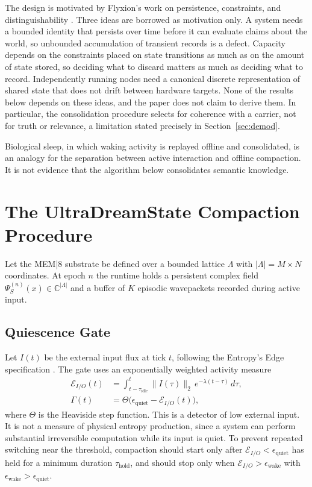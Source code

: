 \documentclass[10pt, twocolumn, a4paper]{article}
\begin{document}
The design is motivated by Flyxion's work on persistence, constraints, and distinguishability \cite{guimond2026admissibility, guimond2026collapse, guimond2026persistence, guimond2026constraints, guimond2026witness, guimond2026wireheading}. Three ideas are borrowed as motivation only. A system needs a bounded identity that persists over time before it can evaluate claims about the world, so unbounded accumulation of transient records is a defect. Capacity depends on the constraints placed on state transitions as much as on the amount of state stored, so deciding what to discard matters as much as deciding what to record. Independently running nodes need a canonical discrete representation of shared state that does not drift between hardware targets. None of the results below depends on these ideas, and the paper does not claim to derive them. In particular, the consolidation procedure selects for coherence with a carrier, not for truth or relevance, a limitation stated precisely in Section~\ref{sec:demod}.

Biological sleep, in which waking activity is replayed offline and consolidated, is an analogy for the separation between active interaction and offline compaction. It is not evidence that the algorithm below consolidates semantic knowledge.

\section{The UltraDreamState Compaction Procedure}

Let the MEM|8 substrate be defined over a bounded lattice $\Lambda$ with $|\Lambda| = M \times N$ coordinates. At epoch $n$ the runtime holds a persistent complex field $\Psi_S^{(n)}(x) \in \mathbb{C}^{|\Lambda|}$ and a buffer of $K$ episodic wavepackets recorded during active input.

\subsection{Quiescence Gate}
Let $I(t)$ be the external input flux at tick $t$, following the Entropy's Edge specification \cite{guimond2026entropy}. The gate uses an exponentially weighted activity measure
\begin{equation}
\begin{split}\mathcal{E}_{I/O}(t) &= \int_{t - \tau_{\text{idle}}}^{t} \|I(\tau)\|_2 \, e^{-\lambda(t - \tau)} \, d\tau,\\ \Gamma(t) &= \Theta\big(\epsilon_{\text{quiet}} - \mathcal{E}_{I/O}(t)\big),\end{split}
\end{equation}
where $\Theta$ is the Heaviside step function. This is a detector of low external input. It is not a measure of physical entropy production, since a system can perform substantial irreversible computation while its input is quiet. To prevent repeated switching near the threshold, compaction should start only after $\mathcal{E}_{I/O}<\epsilon_{\text{quiet}}$ has held for a minimum duration $\tau_{\text{hold}}$, and should stop only when $\mathcal{E}_{I/O}>\epsilon_{\text{wake}}$ with $\epsilon_{\text{wake}}>\epsilon_{\text{quiet}}$.
\end{document}
